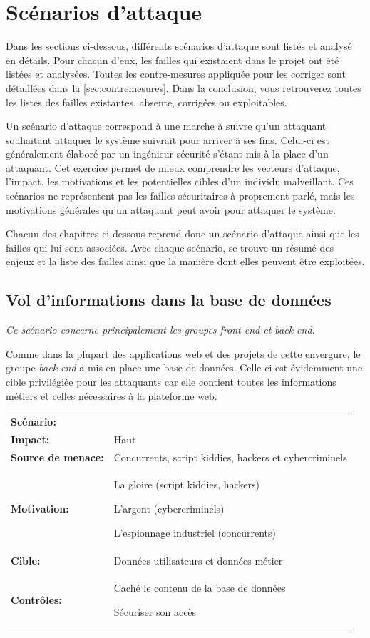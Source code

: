 \documentclass[12pt]{article}
\begin{document}
\section{Scénarios d'attaque}
\label{sec:scenarios}

Dans les sections ci-dessous, différents scénarios d'attaque sont listés et analysé en détails. Pour chacun d'eux, les failles qui existaient dans le projet ont été listées et analysées. Toutes les contre-mesures appliquée pour les corriger sont détaillées dans la \autoref{sec:contremesures}. Dans la \hyperref[sec:conclusion]{conclusion}, vous retrouverez toutes les listes des failles existantes, absente, corrigées ou exploitables.

Un scénario d'attaque correspond à une marche à suivre qu'un attaquant souhaitant attaquer le système suivrait pour arriver à ses fins. Celui-ci est généralement élaboré par un ingénieur sécurité s'étant mis à la place d'un attaquant. Cet exercice permet de mieux comprendre les vecteurs d'attaque, l'impact, les motivations et les potentielles cibles d'un individu malveillant. Ces scénarios ne représentent pas les failles sécuritaires à proprement parlé, mais les motivations générales qu'un attaquant peut avoir pour attaquer le système. 

Chacun des chapitres ci-dessous reprend donc un scénario d'attaque ainsi que les failles qui lui sont associées. Avec chaque scénario, se trouve un résumé des enjeux et la liste des failles ainsi que la manière dont elles peuvent être exploitées.

\subsection{Vol d'informations dans la base de données}

\emph{Ce scénario concerne principalement les groupes front-end et back-end}. 
\medskip

Comme dans la plupart des applications web et des projets de cette envergure, le groupe \emph{back-end} a mis en place une base de données. Celle-ci est évidemment une cible privilégiée pour les attaquants car elle contient toutes les informations métiers et celles nécessaires à la plateforme web.
\medskip

\renewcommand{\arraystretch}{1.6}
\begin{tabular}{@{}p{4cm}p{12cm}}
\textbf{Scénario:} &  \\
\textbf{Impact:} & Haut \\
\textbf{Source de menace: } & Concurrents, script kiddies, hackers et cybercriminels \\
\textbf{Motivation:} & La gloire (script kiddies, hackers)

L'argent (cybercriminels)

L'espionnage industriel (concurrents) \\
\textbf{Cible:} & Données utilisateurs et données métier \\
\textbf{Contrôles:} & Caché le contenu de la base de données

Sécuriser son accès
\end{tabular}
\renewcommand{\arraystretch}{1}
\end{document}
